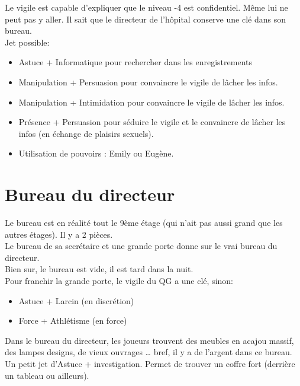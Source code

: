 \documentclass[oneside,12pt]{book}
\begin{document}
\begin{flushleft}
\vspace{0.5cm}
Le vigile est capable d'expliquer que le niveau -4 est confidentiel. Même lui ne peut pas y aller. Il sait que le directeur de l'hôpital conserve une clé dans son bureau.\\
Jet possible: 

\begin{itemize}
\item Astuce + Informatique pour rechercher dans les enregistrements 
\item Manipulation + Persuasion pour convaincre le vigile de lâcher les infos.
\item Manipulation + Intimidation pour convaincre le vigile de lâcher les infos.
\item Présence + Persuasion pour séduire le vigile et le convaincre de lâcher les infos (en échange de plaisirs sexuels).
\item Utilisation de pouvoirs : Emily ou Eugène.
\end{itemize}

\section{Bureau du directeur}
Le bureau est en réalité tout le 9ème étage (qui n'ait pas aussi grand que les autres étages). Il y a 2 pièces.\\
Le bureau de sa secrétaire et une grande porte donne sur le vrai bureau du directeur. \\
Bien sur, le bureau est vide, il est tard dans la nuit.\\
\vspace{0.5cm}
Pour franchir la grande porte, le vigile du QG a une clé, sinon:\\
\begin{itemize}
\item Astuce + Larcin (en discrétion)
\item Force + Athlétisme (en force)
\end{itemize}

Dans le bureau du directeur, les joueurs trouvent des meubles en acajou massif, des lampes designs, de vieux ouvrages … bref, il y a de l'argent dans ce bureau.\\
Un petit jet d'Astuce + investigation. Permet de trouver un coffre fort (derrière un tableau ou ailleurs). \\


\end{flushleft}
\end{document}
